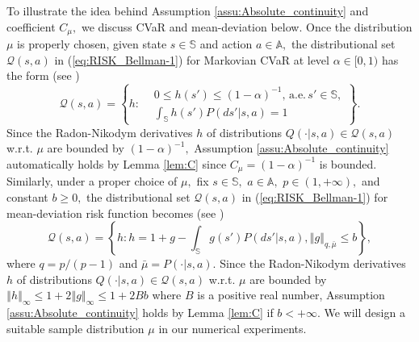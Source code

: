 \documentclass[12pt,technote,onecolumn]{IEEEtran}
\begin{document}
To illustrate the idea behind Assumption \ref{assu:Absolute_continuity}
and coefficient $C_{\mu},$ we discuss CVaR and mean-deviation below.
Once the distribution $\mu$ is properly chosen, given state $s\in\mathbb{S}$ and action $a\in\mathbb{A},$
the distributional set $\mathcal{Q}\left(s,a\right)$ in (\ref{eq:RISK_Bellman-1})
for Markovian CVaR at level $\alpha\in[0,1)$ has the form (see
\cite[Example 4.3]{Ruszczynski:2006uq})
\begin{equation}\label{cvar}
\mathcal{Q}(s,a)=\left\{h:\begin{aligned}&0\leq h\left(s'\right)\leq\left(1-\alpha\right)^{-1},\,\text{a.e.}\,s'\in\mathbb{S},\\&\int_{\mathbb{S}}h\left(s'\right)P\left(ds'|s,a\right)=1\end{aligned}\right\}.
\end{equation}
Since the Radon-Nikodym derivatives $h$ of distributions $Q\left(\cdot\vert s,a\right)\in\mathcal{Q}\left(s,a\right)$
w.r.t. $\mu$ are bounded by $\left(1-\alpha\right)^{-1},$
Assumption \ref{assu:Absolute_continuity} automatically holds by
Lemma \ref{lem:C} since $C_{\mu}=\left(1-\alpha\right)^{-1}$ is bounded. Similarly,
under a proper choice of $\mu,$ fix $s\in\mathbb{S},$ $a\in\mathbb{A},$
$p\in(1,+\infty),$ and constant $b\geq0,$ the distributional set
$\mathcal{Q}\left(s,a\right)$ in (\ref{eq:RISK_Bellman-1}) for
mean-deviation risk function becomes (see \cite[Example 4.1]{Ruszczynski:2006uq})
\[
\mathcal{Q}\left(s,a\right)=\left\{ h:h=1+g-\int_{\mathbb{S}}g\left(s'\right)P\left(ds'\vert s,a\right),\left\Vert g\right\Vert _{q,\bar{\mu}}\leq b\right\},
\]
where $q=p/(p-1)$ and $\bar{\mu}=P(\cdot|s,a).$ Since the Radon-Nikodym derivatives $h$ of distributions $Q\left(\cdot\vert s,a\right)\in\mathcal{Q}\left(s,a\right)$
w.r.t. $\mu$ are bounded by $\left\Vert h\right\Vert _{\infty}\leq1+2\left\Vert g\right\Vert _{\infty}\leq1+2Bb$
where $B$ is a positive real number, Assumption \ref{assu:Absolute_continuity}
holds by Lemma \ref{lem:C} if $b<+\infty.$ We will design a suitable
sample distribution $\mu$ in our numerical experiments.
\end{document}
